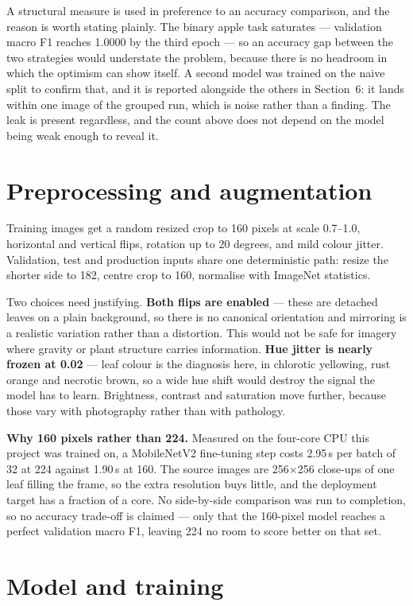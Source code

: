 \documentclass[10pt,a4paper]{article}
\begin{document}
A structural measure is used in preference to an accuracy comparison, and the reason is
worth stating plainly. The binary apple task saturates --- validation macro F1 reaches
1.0000 by the third epoch --- so an accuracy gap between the two strategies would
understate the problem, because there is no headroom in which the optimism can show
itself. A second model was trained on the naive split to confirm that, and it is
reported alongside the others in Section~6: it lands within one image of the grouped
run, which is noise rather than a finding. The leak is present regardless, and the count
above does not depend on the model being weak enough to reveal it.

\section{Preprocessing and augmentation}

Training images get a random resized crop to 160 pixels at scale 0.7--1.0, horizontal
and vertical flips, rotation up to 20 degrees, and mild colour jitter. Validation, test
and production inputs share one deterministic path: resize the shorter side to 182,
centre crop to 160, normalise with ImageNet statistics.

Two choices need justifying. \textbf{Both flips are enabled} --- these are detached
leaves on a plain background, so there is no canonical orientation and mirroring is a
realistic variation rather than a distortion. This would not be safe for imagery where
gravity or plant structure carries information. \textbf{Hue jitter is nearly frozen at
0.02} --- leaf colour is the diagnosis here, in chlorotic yellowing, rust orange and
necrotic brown, so a wide hue shift would destroy the signal the model has to learn.
Brightness, contrast and saturation move further, because those vary with photography
rather than with pathology.

\textbf{Why 160 pixels rather than 224.} Measured on the four-core CPU this project was
trained on, a MobileNetV2 fine-tuning step costs 2.95\,s per batch of 32 at 224 against
1.90\,s at 160. The source images are 256$\times$256 close-ups of one leaf filling the
frame, so the extra resolution buys little, and the deployment target has a fraction of a
core. No side-by-side comparison was run to completion, so no accuracy trade-off is
claimed --- only that the 160-pixel model reaches a perfect validation macro F1, leaving
224 no room to score better on that set.

\section{Model and training}
\end{document}
